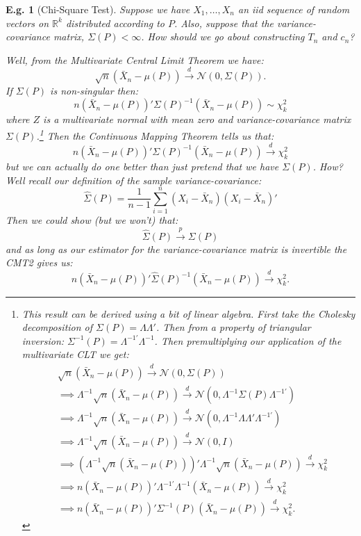 \documentclass{tufte-book}
\theoremstyle{mytheoremstyle}
\theoremstyle{mylemstyle}
\theoremstyle{mydefstyle}
\newtheorem*{ex}{E.g.}
\begin{document}
\begin{ex}[Chi-Square Test] Suppose we have \(X_1, \dots, X_n\) an iid sequence of random vectors on \(\mathbb{R}^k\) distributed according to \(P\). Also, suppose that the variance-covariance matrix, \(\Sigma(P) < \infty\). How should we go about constructing \(T_n\) and \(c_n\)? 

Well, from the Multivariate Central Limit Theorem we have:
	\[\sqrt{n}(\bar{X}_n - \mu(P)) \overset{d}{\rightarrow} \mathcal{N}(0, \Sigma(P)) \text{.}\]
If \(\Sigma(P)\) is non-singular then:
	\[n(\bar{X}_n - \mu(P))'\Sigma(P)^{-1}(\bar{X}_n - \mu(P)) \sim \chi^2_k \]
where \(Z\) is a multivariate normal with mean zero and variance-covariance matrix \(\Sigma(P)\).\footnote{This result can be derived using a bit of linear algebra. First take the Cholesky decomposition of \(\Sigma(P) = \Lambda \Lambda'\). Then from a property of triangular inversion: \(\Sigma^{-1}(P) = \Lambda^{-1'} \Lambda^{-1}\). Then premultiplying our application of the multivariate CLT we get:
	\begin{align*}
		& \sqrt{n}(\bar{X}_n - \mu(P)) \overset{d}{\rightarrow} \mathcal{N}(0, \Sigma(P)) \\
		& \implies \Lambda^{-1} \sqrt{n}(\bar{X}_n - \mu(P)) \overset{d}{\rightarrow} \mathcal{N}(0, \Lambda^{-1}\Sigma(P)\Lambda^{-1'}) \\
		& \implies \Lambda^{-1} \sqrt{n}(\bar{X}_n - \mu(P)) \overset{d}{\rightarrow} \mathcal{N}(0, \Lambda^{-1}\Lambda \Lambda'\Lambda^{-1'}) \\
		& \implies \Lambda^{-1} \sqrt{n}(\bar{X}_n - \mu(P)) \overset{d}{\rightarrow} \mathcal{N}(0, I) \\
		& \implies \left(\Lambda^{-1} \sqrt{n}(\bar{X}_n - \mu(P))\right)' \Lambda^{-1} \sqrt{n}(\bar{X}_n - \mu(P)) \overset{d}{\rightarrow} \chi^2_{k} \\
		& \implies n (\bar{X}_n - \mu(P))' \Lambda^{-1'} \Lambda^{-1} (\bar{X}_n - \mu(P)) \overset{d}{\rightarrow} \chi^2_k \\
		& \implies n (\bar{X}_n - \mu(P))' \Sigma^{-1}(P) (\bar{X}_n - \mu(P))  \overset{d}{\rightarrow} \chi^2_k \text{.}
	\end{align*}} 
Then the Continuous Mapping Theorem tells us that:
	\[n(\bar{X}_n - \mu(P))'\Sigma(P)^{-1}(\bar{X}_n - \mu(P)) \overset{d}{\rightarrow} \chi^2_k \]
but we can actually do one better than just pretend that we have \(\Sigma(P)\). How? Well recall our definition of the sample variance-covariance:
	\[\hat{\Sigma}(P) = \frac{1}{n-1}\sum_{i = 1}^n (X_i - \bar{X}_n)(X_i - \bar{X}_n)' \]
Then we could show (but we won't) that:
	\[\hat{\Sigma}(P) \overset{p}{\rightarrow} \Sigma(P)\]
and as long as our estimator for the variance-covariance matrix is invertible the CMT2 gives us:
	\[n(\bar{X}_n - \mu(P))'\hat{\Sigma}(P)^{-1}(\bar{X}_n - \mu(P)) \overset{d}{\rightarrow} \chi^2_k \text{.}\]


\end{ex}
\end{document}
